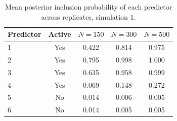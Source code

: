 \begin{table}[H]
\centering
\begin{tabular}{lcccc}
  \toprule
Predictor & Active & $N = 150$ & $N = 300$ & $N = 500$ \\ 
  \midrule
1 & Yes & 0.422 & 0.814 & 0.975 \\ 
  2 & Yes & 0.795 & 0.998 & 1.000 \\ 
  3 & Yes & 0.635 & 0.958 & 0.999 \\ 
  4 & Yes & 0.069 & 0.148 & 0.272 \\ 
  5 & No & 0.014 & 0.006 & 0.005 \\ 
  6 & No & 0.014 & 0.005 & 0.005 \\ 
   \bottomrule
\end{tabular}
\caption{Mean posterior inclusion probability of each predictor across replicates, simulation 1.} 
\label{table:sim1_pred_pip}
\end{table}
